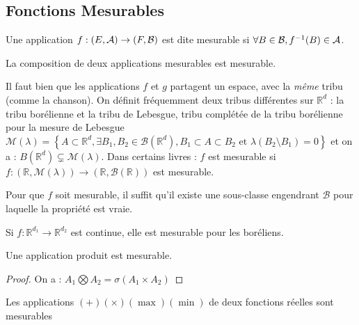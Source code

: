 \documentclass{cours}
\begin{document}
    \subsection{Fonctions Mesurables}
    \begin{definition}
        Une application $f : \left(E, \mathcal{A}\right) \rightarrow (F, \mathcal{B})$ est dite mesurable si $\forall B \in \mathcal{B}, f^{-1}(B) \in \mathcal{A}$.
    \end{definition}
    \begin{theorem}
        La composition de deux applications mesurables est mesurable.
    \end{theorem}
    \begin{remark}
        Il faut bien que les applications $f$ et $g$ partagent un espace, avec la \emph{même} tribu (comme la chanson).
        On définit fréquemment deux tribus différentes sur $\mathbb{R}^{d}$ : la tribu borélienne et la tribu de Lebesgue, tribu complétée de la tribu borélienne pour la mesure de Lebesgue $\mathcal{M}(\lambda) = \left\{A \subset \mathbb{R}^{d}, \exists B_{1}, B_{2} \in \mathcal{B}(\mathbb{R}^{d}), B_1 \subset A \subset B_2 \text{ et } \lambda(B_2 \setminus B_1) = 0 \right\}$
        et on a : $B(\mathbb{R}^{d}) \subsetneq \mathcal{M}(\lambda)$. Dans certains livres : $f$ est mesurable si $f : \left(\mathbb{R}, \mathcal{M}(\lambda)\right) \rightarrow \left(\mathbb{R}, \mathcal{B}(\mathbb{R})\right)$ est mesurable.
    \end{remark}
    \begin{proposition}
        Pour que $f$ soit mesurable, il suffit qu'il existe une sous-classe engendrant $\mathcal{B}$ pour laquelle la propriété est vraie.
    \end{proposition}
    \begin{corollary}
        Si $f : \mathbb{R}^{d_1} \rightarrow\mathbb{R}^{d_2}$ est continue, elle est mesurable pour les boréliens.
    \end{corollary}
    \begin{corollary}
        Une application produit est mesurable.
    \end{corollary}
    \begin{proof}
        On a : $A_{1} \bigotimes A_{2} = \sigma\left(A_{1} \times A_{2}\right)$
    \end{proof}
    \begin{lemma}
        Les applications $(+) (\times) (\max) (\min)$ de deux fonctions réelles sont mesurables
    \end{lemma}
\end{document}
